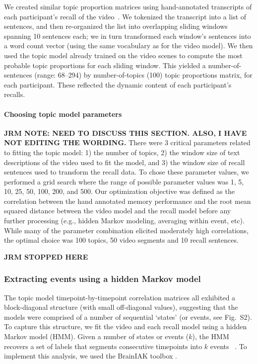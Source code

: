 \documentclass{article}
\newcommand{\corrmats}{S2}
\begin{document}
We created similar topic proportion matrices using hand-annotated transcripts of each participant's recall of the video~\citep[annotated by ][]{ChenEtal17}.  We tokenized the transcript into a list of sentences, and then re-organized the list into overlapping sliding windows spanning 10 sentences each; we in turn transformed each window's sentences into a word count vector (using the same vocabulary as for the video model).  We then used the topic model already trained on the video scenes to compute the most probable topic proportions for each sliding window.  This yielded a number-of-sentences (range: 68--294) by number-of-topics (100) topic proportions matrix, for each participant.  These reflected the dynamic content of each participant's recalls.

\paragraph*{Choosing topic model parameters}
\textbf{JRM NOTE: NEED TO DISCUSS THIS SECTION.  ALSO, I HAVE NOT EDITING THE WORDING.}
There were 3 critical parameters related to fitting the topic model: 1) the number of topics, 2) the window size of text descriptions of the video used to fit the model, and 3) the window size of recall sentences used to transform the recall data.  To chose these parameter values, we performed a grid search where the range of possible parameter values was 1, 5, 10, 25, 50, 100, 200, and 500. Our optimization objective was defined as the correlation between the hand annotated memory performance and the root mean squared distance between the video model and the recall model before any further processing (e.g., hidden Markov modeling, averaging within event, etc). While many of the parameter combination elicited moderately high correlations, the optimal choice was 100 topics, 50 video segments and 10 recall sentences.

\textbf{JRM STOPPED HERE}

\subsubsection*{Extracting events using a hidden Markov model}
The topic model timepoint-by-timepoint correlation matrices all exhibited a block-diagonal structure (with small off-diagonal values), suggesting that the models were comprised of a number of sequential `states' (or events, see Fig.~\corrmats). To capture this structure, we fit the video and each recall model using a hidden Markov model (HMM). Given a number of states or events ($k$), the HMM recovers a set of labels that segments consecutive timepoints into $k$ events ~\citep{Rabi89, BaldEtal17}. To implement this analysis, we used the BrainIAK toolbox \citep{BaldEtal17, Brainiak}.
\end{document}
